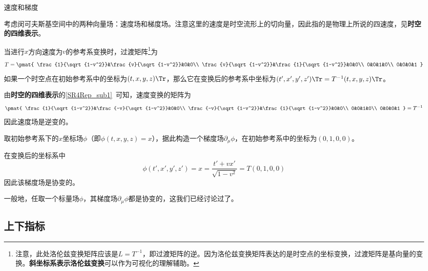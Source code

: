 \begin{example}{速度和梯度}

考虑闵可夫斯基空间中的两种向量场：速度场和梯度场。注意这里的速度是时空流形上的切向量，因此指的是物理上所说的四速度，见\textbf{时空的四维表示}。

当进行$x$方向速度为$v$的参考系变换时，过渡矩阵\footnote{注意，此处洛伦兹变换矩阵应该是$L=T^{-1}$，即过渡矩阵的逆。因为洛伦兹变换矩阵表达的是时空点的坐标变换，过渡矩阵是基向量的变换。\textbf{斜坐标系表示洛伦兹变换}可以作为可视化的理解辅助。}为
\begin{equation}
T=
\pmat{
    \frac{1}{\sqrt{1-v^2}}&\frac{v}{\sqrt{1-v^2}}&0&0\\
    \frac{v}{\sqrt{1-v^2}}&\frac{1}{\sqrt{1-v^2}}&0&0\\
    0&0&1&0\\
    0&0&0&1
}
\end{equation}
如果一个时空点在初始参考系中的坐标为$(t, x, y, z)\Tr$，那么它在变换后的参考系中坐标为$(t', x', y', z')\Tr=T^{-1}(t, x, y, z)\Tr$。


由\textbf{时空的四维表示}的\autoref{SR4Rep_sub1}~可知，速度变换的矩阵为
\begin{equation}
\pmat{
    \frac{1}{\sqrt{1-v^2}}&\frac{-v}{\sqrt{1-v^2}}&0&0\\
    \frac{-v}{\sqrt{1-v^2}}&\frac{1}{\sqrt{1-v^2}}&0&0\\
    0&0&1&0\\
    0&0&0&1
}
=T^{-1}
\end{equation}
因此速度场是逆变的。

取初始参考系下的$x$坐标场$\phi$（即$\phi(t, x, y, z)=x$），据此构造一个梯度场$\partial_\mu \phi$，在初始参考系中的坐标为$(0, 1, 0, 0)$。

在变换后的坐标系中
\begin{equation}
\phi(t', x', y', z')=x=\frac{t'+vx'}{\sqrt{1-v^2}}=T(0, 1, 0, 0)
\end{equation}
因此该梯度场是协变的。

一般地，任取一个标量场$\phi$，其梯度场$\partial_\mu\phi$都是协变的，这我们已经讨论过了。

\end{example}




\subsection{上下指标}

